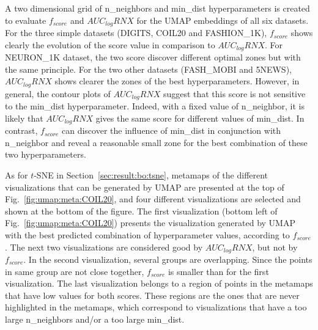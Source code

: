 A two dimensional grid of {n\_neighbors} and {min\_dist} hyperparameters is created to evaluate $f_{score}$ and $AUC_{log}RNX$ for the UMAP embeddings of all six datasets.
For the three simple datasets (DIGITS, COIL20 and {FASHION\_1K}), $f_{score}$ shows clearly the evolution of the score value in comparison to $AUC_{log}RNX$.
For {NEURON\_1K} dataset, the two score discover different optimal zones but with the same principle.
For the two other datasets ({FASH\_MOBI} and 5NEWS), $AUC_{log}RNX$ shows clearer the zones of the best hyperparameters.
However, in general, the contour plots of $AUC_{log}RNX$ suggest that this score is not sensitive to the {min\_dist} hyperparameter.
Indeed, with a fixed value of {n\_neighbor}, it is likely that $AUC_{log}RNX$ gives the same score for different values of {min\_dist}.
In contrast, $f_{score}$ can discover the influence of {min\_dist} in conjunction with {n\_neighbor} and reveal a reasonable small zone for the best combination of these two hyperparameters.


As for $t$-SNE in Section~\ref{sec:result:bo:tsne}, metamaps of the different visualizations that can be generated by UMAP are presented at the top of Fig.~\ref{fig:umap:meta:COIL20}, and four different visualizations are selected and shown at the bottom of the figure.
The first visualization (bottom left of Fig.~\ref{fig:umap:meta:COIL20}) presents the visualization generated by UMAP with the best predicted combination of hyperparameter values, according to $f_{score}$.
The next two visualizations are considered good by $AUC_{log}RNX$, but not by $f_{score}$.
In the second visualization, several groups are overlapping. Since the points in same group are not close together, $f_{score}$ is smaller than for the first visualization.
The last visualization belongs to a region of points in the metamaps that have low values for both scores.
These regions are the ones that are never highlighted in the metamaps, which correspond to visualizations that have a too large {n\_neighbors} and/or a too large {min\_dist}. 

